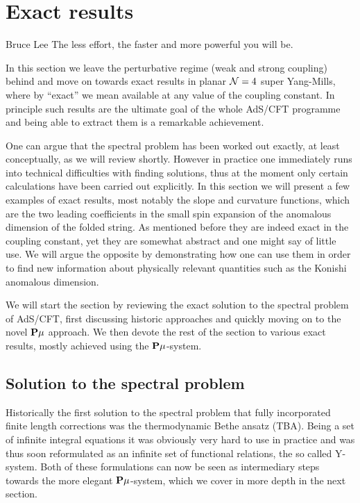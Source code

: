 
\section{Exact results}
\label{sec:exact_results}

\begin{chapquote}{Bruce Lee}
The less effort, the faster and more powerful you will be.
\end{chapquote}

\noindent In this section we leave the perturbative regime (weak and strong coupling) behind and move on towards exact results in planar $\mathcal{N}=4$ super Yang-Mills, where by ``exact'' we mean available at any value of the coupling constant.
In principle such results are the ultimate goal of the whole AdS/CFT programme and being able to extract them is a remarkable achievement.

One can argue that the spectral problem has been worked out exactly, at least conceptually, as we will review shortly.
However in practice one immediately runs into technical difficulties with finding solutions, thus at the moment only certain calculations have been carried out explicitly.
In this section we will present a few examples of exact results, most notably the slope and curvature functions, which are the two leading coefficients in the small spin expansion of the anomalous dimension of the folded string.
As mentioned before they are indeed exact in the coupling constant, yet they are somewhat abstract and one might say of little use.
We will argue the opposite by demonstrating how one can use them in order to find new information about physically relevant quantities such as the Konishi anomalous dimension.

We will start the section by reviewing the exact solution to the spectral problem of AdS/CFT, first discussing historic approaches and quickly moving on to the novel ${\bf P}\mu$ approach.
We then devote the rest of the section to various exact results, mostly achieved using the ${\bf P}\mu$-system.


\subsection{Solution to the spectral problem}
\label{sec:tba_y_system}

Historically the first solution to the spectral problem that fully incorporated finite length corrections was the thermodynamic Bethe ansatz (TBA). 
Being a set of infinite integral equations it was obviously very hard to use in practice and was thus soon reformulated as an infinite set of functional relations, the so called Y-system.
Both of these formulations can now be seen as intermediary steps towards the more elegant ${\bf P}\mu$-system, which we cover in more depth in the next section.


